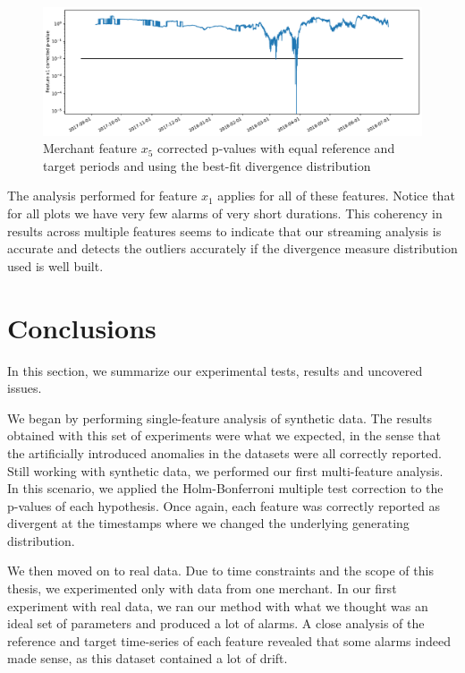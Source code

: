 \documentclass[sigconf]{acmart}
\begin{document}
\begin{figure}[!htb]
    \begin{center}
      \includegraphics[scale=0.25]{figures/merchant3-x5-correctedpvalues.pdf}
      \caption{Merchant feature $x_5$ corrected p-values with equal reference and target periods and using the best-fit divergence distribution}
      \label{fig:merchant3-x5-correctedpvalues}
    \end{center}
\end{figure}
The analysis performed for feature $x_1$ applies for all of these features. Notice that for all plots we have very few alarms of very short durations. This coherency in results across multiple features seems to indicate that our streaming analysis is accurate and detects the outliers accurately if the divergence measure distribution used is well built.


\section{Conclusions}
In this section, we summarize our experimental tests, results and uncovered issues.

We began by performing single-feature analysis of synthetic data. The results obtained with this set of experiments were what we expected, in the sense that the artificially introduced anomalies in the datasets were all correctly reported. Still working with synthetic data, we performed our first multi-feature analysis. In this scenario, we applied the Holm-Bonferroni multiple test correction to the p-values of each hypothesis. Once again, each feature was correctly reported as divergent at the timestamps where we changed the underlying generating distribution.

We then moved on to real data. Due to time constraints and the scope of this thesis, we experimented only with data from one merchant. In our first experiment with real data, we ran our method with what we thought was an ideal set of parameters and produced a lot of alarms. A close analysis of the reference and target time-series of each feature revealed that some alarms indeed made sense, as this dataset contained a lot of drift. 
\end{document}
